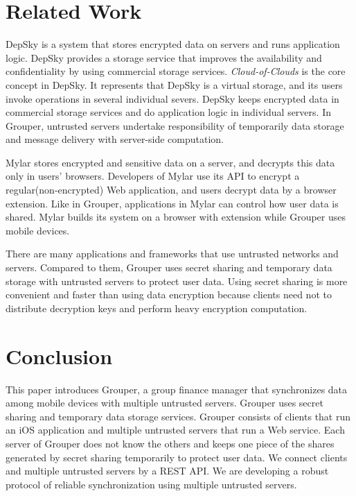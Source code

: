 \documentclass[twocolumn,10pt]{article}
\begin{document}
\section{Related Work}

DepSky\cite{bessani2013depsky} is a system that stores encrypted data on servers and runs application logic. DepSky provides a storage service that improves the availability and confidentiality by using commercial storage services. \emph{Cloud-of-Clouds} is the core concept in DepSky. It represents that DepSky is a virtual storage, and its users invoke operations in several individual severs. DepSky keeps encrypted data in commercial storage services and do application logic in individual servers. In Grouper,  untrusted servers undertake responsibility of temporarily data storage and message delivery with server-side computation.

Mylar\cite{popa2014building} stores encrypted and sensitive data on a server, and decrypts this data only in users’ browsers. Developers of Mylar use its API to encrypt a regular(non-encrypted) Web application, and users decrypt data by a browser extension. Like in Grouper, applications in Mylar can control how user data is shared. Mylar builds its system on a browser with extension while Grouper uses mobile devices.

There are many applications and frameworks that use untrusted networks and servers. Compared to them, Grouper uses secret sharing and temporary data storage with untrusted servers to protect user data. Using secret sharing is more convenient and faster than using data encryption because clients need not to distribute decryption keys and perform heavy encryption computation.

\section{Conclusion}

This paper introduces Grouper, a group finance manager that synchronizes data among mobile devices with multiple untrusted servers. Grouper uses secret sharing and temporary data storage services. Grouper consists of clients that run an iOS application and multiple untrusted servers that run a Web service. Each server of Grouper does not know the others and keeps one piece of the shares generated by secret sharing temporarily to protect user data. We connect clients and multiple untrusted servers by a REST API. We are developing a robust protocol of reliable synchronization using multiple untrusted servers.


{
	\footnotesize
	
}
\end{document}
